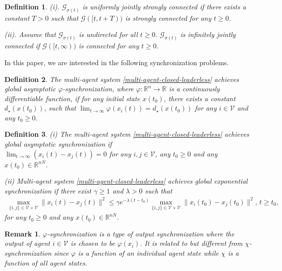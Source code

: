 \documentclass[a4paper, 11pt]{article}
\newtheorem{definition}{Definition}
\newtheorem{remark}{Remark}
\def\R{\mathbb{R}}
\begin{document}
\begin{definition}\label{def-connected-leaderless}
(i). $\mathcal{G}_{\sigma(t)}$ is {\it uniformly jointly strongly connected} if there exists a constant $T>0$ such that $\mathcal{G}([t,t+T))$ is strongly connected for any $t \geq 0$.

(ii). Assume that $\mathcal{G}_{\sigma(t)}$ is undirected for all $t \geq 0$.
$\mathcal{G}_{\sigma(t)}$ is {\it infinitely jointly connected} if $\mathcal{G}([t,\infty))$ is connected for any $t \geq 0$.
\end{definition}

In this paper, we are interested in the following synchronization problems.

\begin{definition}\label{synch-def}
The multi-agent system \eqref{multi-agent-closed-leaderless} achieves global asymptotic $\varphi$-synchronization,
where $\varphi: {\R}^n \rightarrow \R$ is a continuously differentiable function, if
for any initial state $x(t_0)$, there exists a constant $d_\star(x(t_0))$, such that
$\lim_{t \rightarrow \infty} \varphi(x_i(t)) =d_\star(x(t_0))$ for any $i \in \mathcal{V}$ and any $t_0 \geq 0$.
\end{definition}


\begin{definition}\label{syn-asy}
(i) The multi-agent system \eqref{multi-agent-closed-leaderless} achieves global asymptotic synchronization if\\ 
$\lim_{t\to \infty}(x_i(t)-x_j(t))=0$ for any $i,j\in\mathcal{V}$, any $t_0 \geq 0$ and any $x(t_0) \in {\R}^{nN}$.

(ii) Multi-agent system \eqref{multi-agent-closed-leaderless} achieves global exponential synchronization if there exist $\gamma \geq 1$ and $\lambda>0$ such that
\begin{align}
\max_{\{i,j\}\in\mathcal{V}\times\mathcal{V}} \|x_i(t)-x_j(t)\|^2 \leq \gamma e^{-\lambda(t-t_0)} \max_{\{i,j\}\in\mathcal{V}\times\mathcal{V}} \|x_i(t_0)-x_j(t_0)\|^2, \, t\geq t_0,\label{global-expo-LL}
\end{align}
for any $t_0 \geq 0$ and any $x(t_0) \in {\R}^{nN}$.
\end{definition}


\begin{remark}
$\varphi$-synchronization is a type of output synchronization where the output of agent $i \in \mathcal{V}$ is chosen to be $\varphi(x_i)$. It is related to but different from $\chi$-synchronization \cite{cortes-auto08,hong-JSSC2010} since
$\varphi$ is a function of an individual agent state while $\chi$ is a function of all agent states.
\end{remark}
\end{document}
